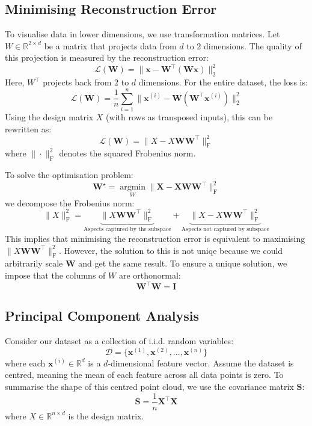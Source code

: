 \subsection{Minimising Reconstruction Error}

To visualise data in lower dimensions, we use transformation matrices. Let $W \in \mathbb{R}^{2 \times d}$ be a matrix that projects data from $d$ to 2 dimensions. The quality of this projection is measured by the reconstruction error:
\[
    \mathcal{L}(\boldsymbol{W}) = \|\boldsymbol{x} - \boldsymbol{W}^\top(\boldsymbol{W}\boldsymbol{x})\|_2^2
\]
Here, $W^\top$ projects back from 2 to $d$ dimensions. For the entire dataset, the loss is:
\[
    \mathcal{L}(\boldsymbol{W}) = \frac{1}{n} \sum_{i=1}^n \|\boldsymbol{x}^{(i)} - \boldsymbol{W}(\boldsymbol{W}^\top \boldsymbol{x}^{(i)})\|_2^2
\]
Using the design matrix $X$ (with rows as transposed inputs), this can be rewritten as:
\[
    \mathcal{L}(\boldsymbol{W}) = \|X - X\boldsymbol{W}\boldsymbol{W}^\top\|_{\mathrm{F}}^2
\]
where $\|\cdot\|_{\mathrm{F}}^2$ denotes the squared Frobenius norm. \bigskip

To solve the optimisation problem:
\[
    \boldsymbol{W}^{\star} = \underset{W}{\operatorname{argmin}} \| \boldsymbol{X} - \boldsymbol{X}\boldsymbol{W}\boldsymbol{W}^\top \|_{\mathrm{F}}^{2}
\]
we decompose the Frobenius norm:
\[
    \|X\|_{\mathrm{F}}^{2} = \underbrace{\|X\boldsymbol{W}\boldsymbol{W}^\top\|_{\mathrm{F}}^{2}}_{\text{Aspects captured by the subspace}} + \underbrace{\|X - X\boldsymbol{W}\boldsymbol{W}^\top\|_{\mathrm{F}}^{2}}_{\text{Aspects not captured by subspace}}
\]
This implies that minimising the reconstruction error is equivalent to maximising $\|X\boldsymbol{W}\boldsymbol{W}^\top\|_{\mathrm{F}}^{2}$. However, the solution to this is not uniqe because we could arbitrarily scale $\bm{W}$ and get the same result. To ensure a unique solution, we impose that the columns of $W$ are orthonormal:
\[
    \boldsymbol{W}^\top \boldsymbol{W} = \mathbf{I}
\]

\subsection{Principal Component Analysis}

Consider our dataset as a collection of i.i.d. random variables:
\[
    \mathcal{D} = \{\mathbf{x}^{(1)}, \mathbf{x}^{(2)}, \ldots, \mathbf{x}^{(n)}\}
\]
where each $\mathbf{x}^{(i)} \in \mathbb{R}^{d}$ is a $d$-dimensional feature vector. Assume the dataset is centred, meaning the mean of each feature across all data points is zero. To summarise the shape of this centred point cloud, we use the covariance matrix $\bm{S}$:
\[
    \bm{S} = \frac{1}{n} \bm{X}^\top \bm{X}
\]
where $X \in \mathbb{R}^{n \times d}$ is the design matrix. \bigskip

